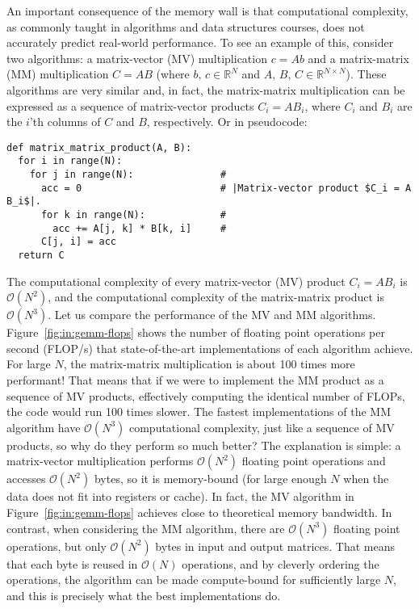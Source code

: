 An important consequence of the memory wall is that computational complexity, as commonly taught in algorithms and data structures courses, does not accurately predict real-world performance. To see an example of this, consider two algorithms: a matrix-vector (MV) multiplication $c = A b$ and a matrix-matrix (MM) multiplication $C = A B$ (where $b,\,c\in \mathbb{R}^N$ and $A,\,B,\,C\in \mathbb{R}^{N\times N}$). These algorithms are very similar and, in fact, the matrix-matrix multiplication can be expressed as a sequence of matrix-vector products $C_i = A B_i$, where $C_i$ and $B_i$ are the $i$'th columns of $C$ and $B$, respectively. Or in pseudocode:
\begin{verbatim}
def matrix_matrix_product(A, B):
  for i in range(N):
    for j in range(N):               #
      acc = 0                        # |Matrix-vector product $C_i = A B_i$|.
      for k in range(N):             # 
        acc += A[j, k] * B[k, i]     #
      C[j, i] = acc
  return C
\end{verbatim}
The computational complexity of every matrix-vector (MV) product $C_i = A B_i$ is $\mathcal{O}(N^2)$, and the computational complexity of the matrix-matrix product is $\mathcal{O}(N^3)$. Let us compare the performance of the MV and MM algorithms. Figure~\ref{fig:in:gemm-flops} shows the number of floating point operations per second (FLOP/s) that state-of-the-art implementations of each algorithm achieve. For large $N$, the matrix-matrix multiplication is about 100 times more performant! That means that if we were to implement the MM product as a sequence of MV products, effectively computing the identical number of FLOPs, the code would run 100 times slower. The fastest implementations of the MM algorithm have $\mathcal{O}(N^3)$ computational complexity, just like a sequence of MV products, so why do they perform so much better? The explanation is simple: a matrix-vector multiplication performs $\mathcal{O}(N^2)$ floating point operations and accesses $\mathcal{O}(N^2)$ bytes, so it is memory-bound (for large enough $N$ when the data does not fit into registers or cache). In fact, the MV algorithm in Figure~\ref{fig:in:gemm-flops} achieves close to theoretical memory bandwidth. In contrast, when considering the MM algorithm, there are $\mathcal{O}(N^3)$ floating point operations, but only $\mathcal{O}(N^2)$ bytes in input and output matrices. That means that each byte is reused in $\mathcal{O}(N)$ operations, and by cleverly ordering the operations, the algorithm can be made compute-bound for sufficiently large $N$, and this is precisely what the best implementations do.

